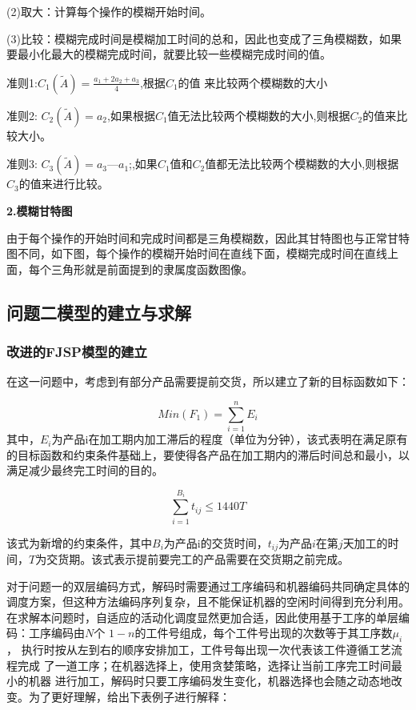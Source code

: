 \documentclass{whutmod}
\begin{document}
\begin{spacing}{1.2}
    		(2)取大：计算每个操作的模糊开始时间。

           (3)比较：模糊完成时间是模糊加工时间的总和，因此也变成了三角模糊数，如果要最小化最大的模糊完成时间，就要比较一些模糊完成时间的值。

           准则1:$C_1(\widetilde{A})=\frac{a_{1}+2a_{2}+ a_{3}  }{4} $,根据$C_1$的值 来比较两个模糊数的大小

            准则2: $C_2(\widetilde{A})=a_2$,如果根据$C_1$值无法比较两个模糊数的大小,则根据$C_2$的值来比较大小。

            准则3: $C_3(\widetilde{A})=a_3—a_1$;,如果$C_1$值和$C_2$值都无法比较两个模糊数的大小,则根据$C_3$的值来进行比较\cite{5}。

    	
   	\textbf{2.模糊甘特图} 
   	
   	由于每个操作的开始时间和完成时间都是三角模糊数，因此其甘特图也与正常甘特图不同，如下图，每个操作的模糊开始时间在直线下面，模糊完成时间在直线上面，每个三角形就是前面提到的隶属度函数图像。
   
   
    
    
    
   
    
    \subsection{问题二模型的建立与求解}
     \subsubsection{改进的FJSP模型的建立}
    在这一问题中，考虑到有部分产品需要提前交货，所以建立了新的目标函数如下：
    
    \begin{equation}
    Min\left ( F_{1}  \right ) = \sum_{i=1}^{n} E_{i}   
    \end{equation}
    其中，$E_{i}$为产品i在加工期内加工滞后的程度（单位为分钟），该式表明在满足原有的目标函数和约束条件基础上，要使得各产品在加工期内的滞后时间总和最小，以满足减少最终完工时间的目的。
    
   \begin{equation}
     \sum_{i=1}^{B_{i} } t_{ij} \le 1440T
    \end{equation}

    该式为新增的约束条件，其中$B_{i}$为产品i的交货时间，$t_{ij}$为产品$i$在第$j$天加工的时间，$T$为交货期。该式表示提前要完工的产品需要在交货期之前完成。

   
   对于问题一的双层编码方式，解码时需要通过工序编码和机器编码共同确定具体的调度方案，但这种方法编码序列复杂，且不能保证机器的空闲时间得到充分利用。在求解本问题时，自适应的活动化调度显然更加合适，因此使用基于工序的单层编码：工序编码由$ N $个 $1-n $的工件号组成，每个工件号出现的次数等于其工序数$\mu_{i}$， 执行时按从左到右的顺序安排加工，工件号每出现一次代表该工件遵循工艺流程完成 了一道工序；在机器选择上，使用贪婪策略，选择让当前工序完工时间最小的机器 进行加工，解码时只要工序编码发生变化，机器选择也会随之动态地改变。为了更好理解，给出下表例子进行解释：


\end{spacing}
\end{document}
